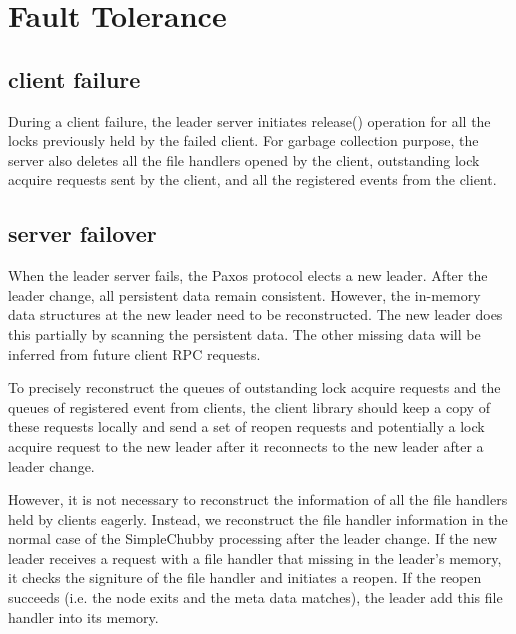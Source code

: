 \section{Fault Tolerance}
\label{section:failure}

\subsection{client failure}

During a client failure, the leader server initiates release() operation for
all the locks previously held by the failed client. For garbage collection
purpose, the server also deletes all the file handlers opened by the client,
outstanding lock acquire requests sent by the client, and all the registered
events from the client.


\subsection{server failover}

When the leader server fails, the Paxos protocol elects a new leader. After
the leader change, all persistent data remain consistent. However, the in-memory
data structures at the new leader need to be reconstructed. The new leader
does this partially by scanning the persistent data. The other missing data
will be inferred from future client RPC requests.

To precisely reconstruct the queues of outstanding lock acquire requests and
the queues of registered event from clients, the client library should keep
a copy of these requests locally and send a set of reopen requests and
potentially a lock acquire request to the new leader after it reconnects
to the new leader after a leader change.

However, it is not necessary to reconstruct the information of all the file
handlers held by clients eagerly. Instead, we reconstruct the file handler
information in the normal case of the SimpleChubby processing after the
leader change. If the new leader receives a request with a file handler that
missing in the leader's memory, it checks the signiture of the file
handler and initiates a reopen. If the reopen succeeds (i.e. the node exits
and the meta data matches), the leader add this file handler into its memory.

